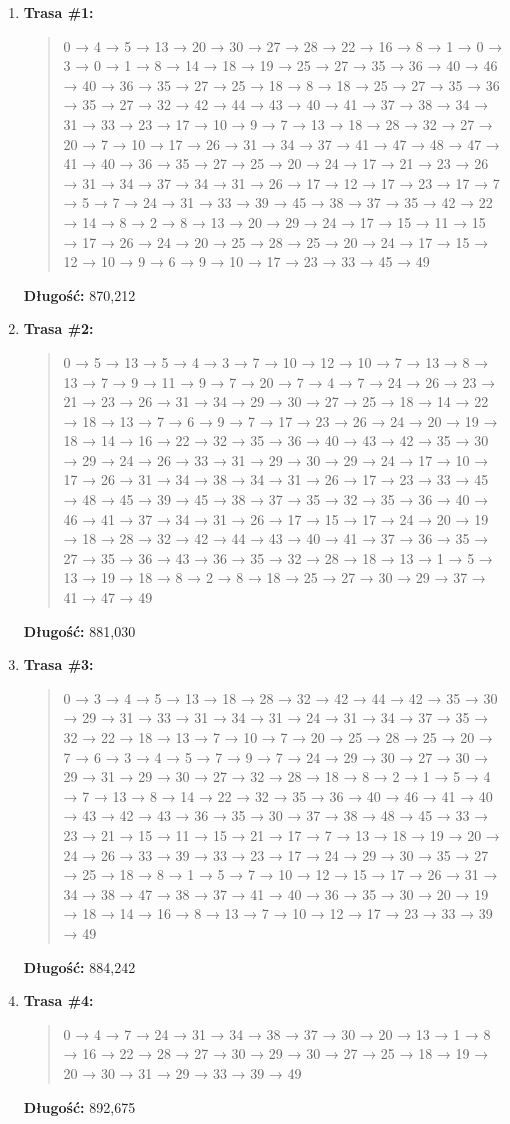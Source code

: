\documentclass{article}
\begin{document}
\begin{enumerate}
    \item \textbf{Trasa \#1:}
    \begin{quote}
        0 → 4 → 5 → 13 → 20 → 30 → 27 → 28 → 22 → 16 → 8 → 1 → 0 → 3 → 0 → 1 → 8 → 14 → 18 → 19 → 25 → 27 → 35 → 36 → 40 → 46 → 40 → 36 → 35 → 27 → 25 → 18 → 8 → 18 → 25 → 27 → 35 → 36 → 35 → 27 → 32 → 42 → 44 → 43 → 40 → 41 → 37 → 38 → 34 → 31 → 33 → 23 → 17 → 10 → 9 → 7 → 13 → 18 → 28 → 32 → 27 → 20 → 7 → 10 → 17 → 26 → 31 → 34 → 37 → 41 → 47 → 48 → 47 → 41 → 40 → 36 → 35 → 27 → 25 → 20 → 24 → 17 → 21 → 23 → 26 → 31 → 34 → 37 → 34 → 31 → 26 → 17 → 12 → 17 → 23 → 17 → 7 → 5 → 7 → 24 → 31 → 33 → 39 → 45 → 38 → 37 → 35 → 42 → 22 → 14 → 8 → 2 → 8 → 13 → 20 → 29 → 24 → 17 → 15 → 11 → 15 → 17 → 26 → 24 → 20 → 25 → 28 → 25 → 20 → 24 → 17 → 15 → 12 → 10 → 9 → 6 → 9 → 10 → 17 → 23 → 33 → 45 → 49
    \end{quote}
    \textbf{Długość:} 870{,}212

    \item \textbf{Trasa \#2:}
    \begin{quote}
        0 → 5 → 13 → 5 → 4 → 3 → 7 → 10 → 12 → 10 → 7 → 13 → 8 → 13 → 7 → 9 → 11 → 9 → 7 → 20 → 7 → 4 → 7 → 24 → 26 → 23 → 21 → 23 → 26 → 31 → 34 → 29 → 30 → 27 → 25 → 18 → 14 → 22 → 18 → 13 → 7 → 6 → 9 → 7 → 17 → 23 → 26 → 24 → 20 → 19 → 18 → 14 → 16 → 22 → 32 → 35 → 36 → 40 → 43 → 42 → 35 → 30 → 29 → 24 → 26 → 33 → 31 → 29 → 30 → 29 → 24 → 17 → 10 → 17 → 26 → 31 → 34 → 38 → 34 → 31 → 26 → 17 → 23 → 33 → 45 → 48 → 45 → 39 → 45 → 38 → 37 → 35 → 32 → 35 → 36 → 40 → 46 → 41 → 37 → 34 → 31 → 26 → 17 → 15 → 17 → 24 → 20 → 19 → 18 → 28 → 32 → 42 → 44 → 43 → 40 → 41 → 37 → 36 → 35 → 27 → 35 → 36 → 43 → 36 → 35 → 32 → 28 → 18 → 13 → 1 → 5 → 13 → 19 → 18 → 8 → 2 → 8 → 18 → 25 → 27 → 30 → 29 → 37 → 41 → 47 → 49
    \end{quote}
    \textbf{Długość:} 881{,}030

    \item \textbf{Trasa \#3:}
    \begin{quote}
        0 → 3 → 4 → 5 → 13 → 18 → 28 → 32 → 42 → 44 → 42 → 35 → 30 → 29 → 31 → 33 → 31 → 34 → 31 → 24 → 31 → 34 → 37 → 35 → 32 → 22 → 18 → 13 → 7 → 10 → 7 → 20 → 25 → 28 → 25 → 20 → 7 → 6 → 3 → 4 → 5 → 7 → 9 → 7 → 24 → 29 → 30 → 27 → 30 → 29 → 31 → 29 → 30 → 27 → 32 → 28 → 18 → 8 → 2 → 1 → 5 → 4 → 7 → 13 → 8 → 14 → 22 → 32 → 35 → 36 → 40 → 46 → 41 → 40 → 43 → 42 → 43 → 36 → 35 → 30 → 37 → 38 → 48 → 45 → 33 → 23 → 21 → 15 → 11 → 15 → 21 → 17 → 7 → 13 → 18 → 19 → 20 → 24 → 26 → 33 → 39 → 33 → 23 → 17 → 24 → 29 → 30 → 35 → 27 → 25 → 18 → 8 → 1 → 5 → 7 → 10 → 12 → 15 → 17 → 26 → 31 → 34 → 38 → 47 → 38 → 37 → 41 → 40 → 36 → 35 → 30 → 20 → 19 → 18 → 14 → 16 → 8 → 13 → 7 → 10 → 12 → 17 → 23 → 33 → 39 → 49
    \end{quote}
    \textbf{Długość:} 884{,}242
    \item \textbf{Trasa \#4:}
    \begin{quote}
        0 → 4 → 7 → 24 → 31 → 34 → 38 → 37 → 30 → 20 → 13 → 1 → 8 → 16 → 22 → 28 → 27 → 30 → 29 → 30 → 27 → 25 → 18 → 19 → 20 → 30 → 31 → 29 → 33 → 39 → 49
    \end{quote}
    \textbf{Długość:} 892{,}675


\end{enumerate}
\end{document}
